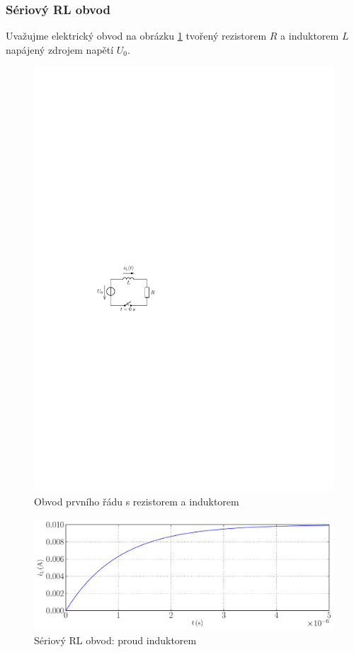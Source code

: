 \subsubsection{Sériový RL obvod}

Uvažujme elektrický obvod na obrázku \ref{fig:prvni_rad_rl} tvořený rezistorem $R$ a induktorem $L$ napájený zdrojem napětí $U_0$. 
\begin{figure}[h!]
\centering
\includegraphics[]{prechodne_jevy/prvni_rad/rl.pdf}
\caption{Obvod prvního řádu s rezistorem a induktorem}
\label{fig:prvni_rad_rl}
\end{figure}

\begin{figure}[h!]
\centering
\includegraphics[width=13cm]{prechodne_jevy/prvni_rad/obvod_rl_proud.pdf}
\caption{Sériový RL obvod: proud induktorem}
\label{fig:obvod_rl_proud}
\end{figure}
